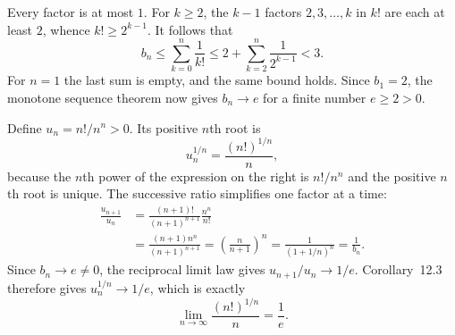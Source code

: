 Every factor is at most $1$. For $k\ge2$, the $k-1$ factors
$2,3,\ldots,k$ in $k!$ are each at least $2$, whence
$k!\ge2^{k-1}$. It follows that
\[
 b_n\le\sum_{k=0}^{n}\frac{1}{k!}
 \le 2+\sum_{k=2}^{n}\frac{1}{2^{k-1}}<3.
\]
For $n=1$ the last sum is empty, and the same bound holds.
Since $b_1=2$, the monotone sequence theorem now gives
$b_n\to e$ for a finite number $e\ge2>0$.

Define $u_n=n!/n^n>0$. Its positive $n$th root is
\[
 u_n^{1/n}=\frac{(n!)^{1/n}}{n},
\]
because the $n$th power of the expression on the right is
$n!/n^n$ and the positive $n$th root is unique.
The successive ratio simplifies one factor at a time:
\[
 \begin{aligned}
 \frac{u_{n+1}}{u_n}
 &=\frac{(n+1)!}{(n+1)^{n+1}}\frac{n^n}{n!}\\
 &=\frac{(n+1)n^n}{(n+1)^{n+1}}
 =\left(\frac{n}{n+1}\right)^n
 =\frac{1}{(1+1/n)^n}
 =\frac{1}{b_n}.
 \end{aligned}
\]
Since $b_n\to e\ne0$, the reciprocal limit law gives
$u_{n+1}/u_n\to1/e$. Corollary~12.3 therefore gives
$u_n^{1/n}\to1/e$, which is exactly
\[
 \boxed{\lim_{n\to\infty}\frac{(n!)^{1/n}}{n}=\frac{1}{e}.}
\]
